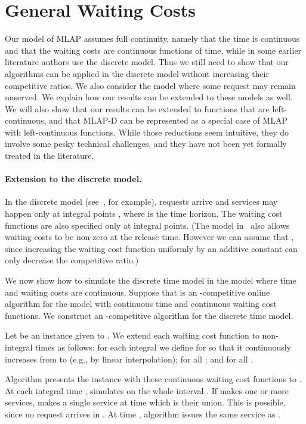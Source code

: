 \documentclass[a4paper]{article}
\newcommand{\MLAP}{\mbox{\rm\textsf{MLAP}}}
\newcommand{\MLAPD}{\mbox{\rm\textsf{MLAP-D}}}
\begin{document}
\section{General Waiting Costs}
\label{sec: general waiting costs}

Our model of {\MLAP} assumes full continuity, namely that the time is
continuous and that the waiting costs are continuous functions of
time, while in some earlier literature authors use the discrete model.
Thus we still need to show that our algorithms can be applied in the
discrete model without increasing their competitive ratios. We also
consider the model where some request may remain unserved.  We
explain how our results can be extended to these models as well. 
We will also show that our results can be extended to functions that
are left-continuous, and that {\MLAPD} can be represented as a special
case of {\MLAP} with left-continuous functions. While those reductions
seem intuitive, they do involve some pesky technical challenges, and they
have not been yet formally treated in the literature.


\paragraph{Extension to the discrete model.} 

In the discrete model (see~\cite{jrp-online-buchbinder}, for example), 
requests arrive and services may happen only at integral
points , where  is the time horizon. The waiting
cost functions  are also specified only at integral
points. (The model in~\cite{jrp-online-buchbinder} also allows waiting costs to be
non-zero at the release time. However we can assume that , since
increasing the waiting cost function uniformly by an additive constant can only decrease the
competitive ratio.)

We now show how to simulate the discrete time model in the model where time
and waiting costs are continuous. Suppose that  is an
-competitive online algorithm for the model with continuous time and continuous 
waiting cost functions.  We construct an -competitive
algorithm  for the discrete time model.

Let  be an instance given to . We
extend each waiting cost function  to non-integral
times as follows: for each integral  we define
 for  so that it continuously
increases from  to  (e.g., by linear interpolation);
 for all ; and
 for all . 

Algorithm  presents the instance 
with these continuous waiting cost functions to . At each
integral time ,  simulates  on the whole
interval .  If  makes one or more services, 
makes a single service at time  which is their union. This is
possible, since no request arrives in . At time ,
algorithm  issues the same service as .
\end{document}

